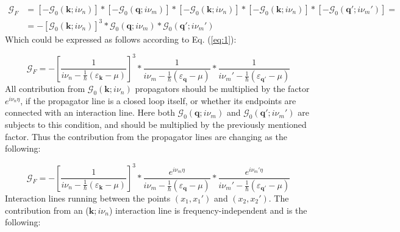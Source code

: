 \begin{align} \label{eq:2}
\mathcal{G}_{F}
&=
\left[ - \mathcal{G}_{0} \left( \boldsymbol{k}; i \nu_{n} \right) \right]
*
\left[ - \mathcal{G}_{0} \left( \boldsymbol{q}; i \nu_{m} \right) \right]
*
\left[ - \mathcal{G}_{0} \left( \boldsymbol{k}; i \nu_{n} \right) \right]
*
\left[ - \mathcal{G}_{0} \left( \boldsymbol{k}; i \nu_{n} \right) \right]
*
\left[ - \mathcal{G}_{0} \left( \boldsymbol{q}'; i \nu_{m}' \right) \right]
= \nonumber \\
&=
- \left[ \mathcal{G}_{0} \left( \boldsymbol{k}; i \nu_{n} \right) \right]^{3}
*
\mathcal{G}_{0} \left( \boldsymbol{q}; i \nu_{m} \right)
*
\mathcal{G}_{0} \left( \boldsymbol{q}'; i \nu_{m}' \right)
\end{align}
Which could be expressed as follows according to Eq. (\ref{eq:1}):

\begin{equation} \label{eq:3}
\mathcal{G}_{F}
=
- \left[ \frac{1}{i \nu_{n} - \frac{1}{\hbar} \left( \varepsilon_{\boldsymbol{k}} - \mu \right)} \right]^{3}
*
\frac{1}{i \nu_{m} - \frac{1}{\hbar} \left( \varepsilon_{\boldsymbol{q}} - \mu \right)}
*
\frac{1}{i \nu_{m}' - \frac{1}{\hbar} \left( \varepsilon_{\boldsymbol{q}'} - \mu \right)}
\end{equation}
All contribution from $\mathcal{G}_{0} \left( \boldsymbol{k}; i \nu_{n} \right)$ propagators should be multiplied by the factor $e^{i \nu_{n} \eta}$, if the propagator line is a closed loop itself, or whether its endpoints are connected with an interaction line. Here both $\mathcal{G}_{0} \left( \boldsymbol{q}; i \nu_{m} \right)$ and $\mathcal{G}_{0} \left( \boldsymbol{q}'; i \nu_{m}' \right)$ are subjects to this condition, and should be multiplied by the previously mentioned factor. Thus the contribution from the propagator lines are changing as the following:

\begin{equation} \label{eq:4}
\mathcal{G}_{F}
=
- \left[ \frac{1}{i \nu_{n} - \frac{1}{\hbar} \left( \varepsilon_{\boldsymbol{k}} - \mu \right)} \right]^{3}
*
\frac{e^{i \nu_{m} \eta}}{i \nu_{m} - \frac{1}{\hbar} \left( \varepsilon_{\boldsymbol{q}} - \mu \right)}
*
\frac{e^{i \nu_{m}' \eta}}{i \nu_{m}' - \frac{1}{\hbar} \left( \varepsilon_{\boldsymbol{q}'} - \mu \right)}
\end{equation}
Interaction lines running between the points $\left( x_{1}, x_{1}' \right)$ and $\left( x_{2}, x_{2}' \right)$. The contribution from an ($\boldsymbol{k}; i \nu_{n}$) interaction line is frequency-independent and is the following:

